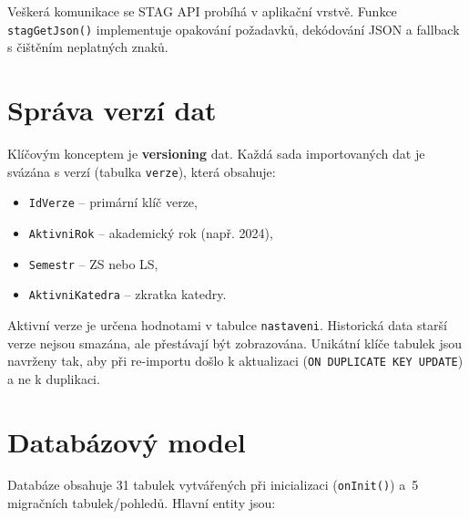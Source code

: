\documentclass[12pt,a4paper]{report}
\begin{document}
Veškerá komunikace se STAG API probíhá v aplikační vrstvě. Funkce \texttt{stagGetJson()} implementuje opakování požadavků, dekódování JSON a fallback s čištěním neplatných znaků.

\section{Správa verzí dat}

Klíčovým konceptem je \textbf{versioning} dat. Každá sada importovaných dat je svázána s verzí (tabulka \texttt{verze}), která obsahuje:
\begin{itemize}
  \item \texttt{IdVerze} -- primární klíč verze,
  \item \texttt{AktivniRok} -- akademický rok (např. 2024),
  \item \texttt{Semestr} -- ZS nebo LS,
  \item \texttt{AktivniKatedra} -- zkratka katedry.
\end{itemize}

Aktivní verze je určena hodnotami v tabulce \texttt{nastaveni}. Historická data starší verze nejsou smazána, ale přestávají být zobrazována. Unikátní klíče tabulek jsou navrženy tak, aby při re-importu došlo k aktualizaci (\texttt{ON DUPLICATE KEY UPDATE}) a ne k duplikaci.

\section{Databázový model}

Databáze obsahuje 31 tabulek vytvářených při inicializaci (\texttt{onInit()}) a~5 migračních tabulek/pohledů. Hlavní entity jsou:
\end{document}
